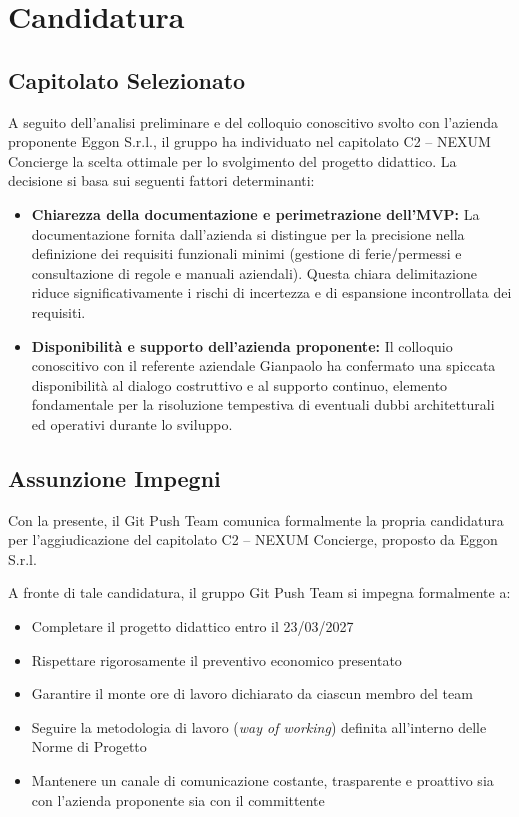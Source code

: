 \documentclass[documento]{gpt}
\begin{document}
\section{Candidatura}

\subsection{Capitolato Selezionato}
A seguito dell'analisi preliminare e del colloquio conoscitivo svolto con l'azienda proponente Eggon S.r.l., il gruppo ha individuato nel capitolato C2 -- NEXUM Concierge la scelta ottimale per lo svolgimento del progetto didattico. La decisione si basa sui seguenti fattori determinanti:

\begin{itemize}
    \item \textbf{Chiarezza della documentazione e perimetrazione dell'MVP:} La documentazione fornita dall'azienda si distingue per la precisione nella definizione dei requisiti funzionali minimi (gestione di ferie/permessi e consultazione di regole e manuali aziendali). Questa chiara delimitazione riduce significativamente i rischi di incertezza e di espansione incontrollata dei requisiti.
    
    \item \textbf{Disponibilità e supporto dell'azienda proponente:} Il colloquio conoscitivo con il referente aziendale Gianpaolo ha confermato una spiccata disponibilità al dialogo costruttivo e al supporto continuo, elemento fondamentale per la risoluzione tempestiva di eventuali dubbi architetturali ed operativi durante lo sviluppo.
\end{itemize}

\subsection{Assunzione Impegni}
Con la presente, il Git Push Team comunica formalmente la propria candidatura per l'aggiudicazione del capitolato C2 -- NEXUM Concierge, proposto da Eggon S.r.l.

A fronte di tale candidatura, il gruppo Git Push Team si impegna formalmente a:
\begin{itemize}
    \item Completare il progetto didattico entro il 23/03/2027
    \item Rispettare rigorosamente il preventivo economico presentato
    \item Garantire il monte ore di lavoro dichiarato da ciascun membro del team
    \item Seguire la metodologia di lavoro (\textit{way of working}) definita all'interno delle Norme di Progetto
    \item Mantenere un canale di comunicazione costante, trasparente e proattivo sia con l'azienda proponente sia con il committente
\end{itemize}
\end{document}
